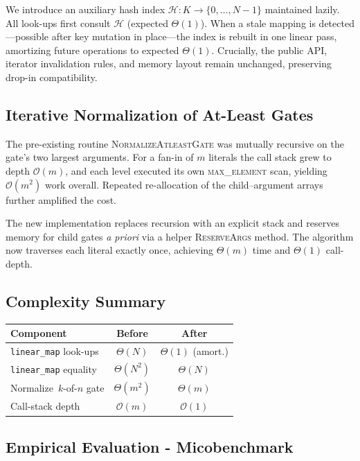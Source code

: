 We introduce an auxiliary hash index $\mathcal{H}: K \to \{0,\dots,N-1\}$ maintained lazily.  All look-ups first consult $\mathcal{H}$ (expected $\Theta(1)$).  When a stale mapping is detected—possible after key mutation in place—the index is rebuilt in one linear pass, amortizing future operations to expected $\Theta(1)$.  Crucially, the public API, iterator invalidation rules, and memory layout remain unchanged, preserving drop-in compatibility.

\subsection{Iterative Normalization of At-Least Gates}
\label{sec:kc_iterative_normalise}

The pre-existing routine \textsc{NormalizeAtleastGate} was mutually recursive on the gate’s two largest arguments.  For a fan-in of $m$ literals the call stack grew to depth $\mathcal{O}(m)$, and each level executed its own \textsc{max\_element} scan, yielding $\mathcal{O}(m^{2})$ work overall.  Repeated re-allocation of the child–argument arrays further amplified the cost.

The new implementation replaces recursion with an explicit stack and reserves memory for child gates \emph{a priori} via a helper \textsc{ReserveArgs} method.  The algorithm now traverses each literal exactly once, achieving $\Theta(m)$ time and $\Theta(1)$ call-depth.

\subsection{Complexity Summary}
\label{sec:kc_complexity}

\begin{center}
\begin{tabular}{lcc}
\toprule
Component & Before & After \\\midrule
\texttt{linear\_map} look-ups & $\Theta(N)$ & $\Theta(1)$ (amort.) \\
\texttt{linear\_map} equality & $\Theta(N^{2})$ & $\Theta(N)$ \\
Normalize~$k$-of-$n$ gate & $\Theta(m^{2})$ & $\Theta(m)$ \\
Call-stack depth & $\mathcal{O}(m)$ & $\mathcal{O}(1)$ \\\bottomrule
\end{tabular}
\end{center}

\subsection{Empirical Evaluation - Micobenchmark}
\label{sec:kc_empirical}

